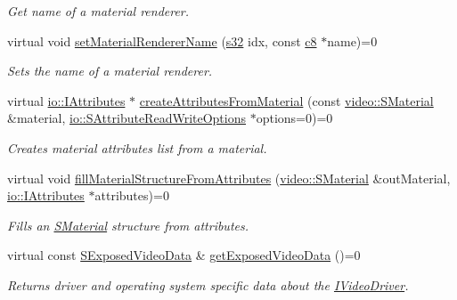 \begin{DoxyCompactItemize}
\begin{DoxyCompactList}\small\item\em Get name of a material renderer. \end{DoxyCompactList}\item 
virtual void \hyperlink{classirr_1_1video_1_1IVideoDriver_a4ef324ed93094f84832e8d31cf0776f2}{set\+Material\+Renderer\+Name} (\hyperlink{namespaceirr_ac66849b7a6ed16e30ebede579f9b47c6}{s32} idx, const \hyperlink{namespaceirr_a9395eaea339bcb546b319e9c96bf7410}{c8} $\ast$name)=0
\begin{DoxyCompactList}\small\item\em Sets the name of a material renderer. \end{DoxyCompactList}\item 
virtual \hyperlink{classirr_1_1io_1_1IAttributes}{io\+::\+I\+Attributes} $\ast$ \hyperlink{classirr_1_1video_1_1IVideoDriver_a4e496fec6b4b0b70d2e95b2576eaffee}{create\+Attributes\+From\+Material} (const \hyperlink{classirr_1_1video_1_1SMaterial}{video\+::\+S\+Material} \&material, \hyperlink{structirr_1_1io_1_1SAttributeReadWriteOptions}{io\+::\+S\+Attribute\+Read\+Write\+Options} $\ast$options=0)=0
\begin{DoxyCompactList}\small\item\em Creates material attributes list from a material. \end{DoxyCompactList}\item 
virtual void \hyperlink{classirr_1_1video_1_1IVideoDriver_a9b7b5942cf2378f9f96d47ec7a0cd881}{fill\+Material\+Structure\+From\+Attributes} (\hyperlink{classirr_1_1video_1_1SMaterial}{video\+::\+S\+Material} \&out\+Material, \hyperlink{classirr_1_1io_1_1IAttributes}{io\+::\+I\+Attributes} $\ast$attributes)=0
\begin{DoxyCompactList}\small\item\em Fills an \hyperlink{classirr_1_1video_1_1SMaterial}{S\+Material} structure from attributes. \end{DoxyCompactList}\item 
virtual const \hyperlink{structirr_1_1video_1_1SExposedVideoData}{S\+Exposed\+Video\+Data} \& \hyperlink{classirr_1_1video_1_1IVideoDriver_a4f3535b2125e654e2e9645745e50cc49}{get\+Exposed\+Video\+Data} ()=0
\begin{DoxyCompactList}\small\item\em Returns driver and operating system specific data about the \hyperlink{classirr_1_1video_1_1IVideoDriver}{I\+Video\+Driver}. \end{DoxyCompactList}\item 

\end{DoxyCompactItemize}
